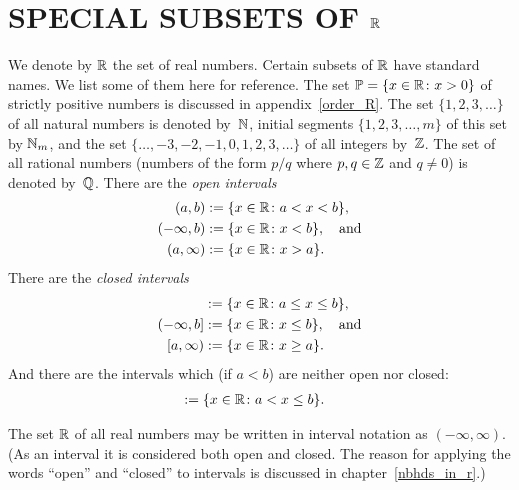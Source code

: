 \chapter{SPECIAL SUBSETS OF $\mathbb{R}$}


We denote by
$\mathbb{R}$ the set of real numbers.  Certain subsets of $\mathbb{R}$ have standard names.  We list some of
them here for reference. The set
$\mathbb{P} = \{x \in \mathbb{R}\colon  x > 0\}$ of strictly positive numbers is discussed in
appendix~\ref{order_R}. The set $\{1,2,3,\dots\}$ of all
natural numbers is denoted by~$\mathbb{N}$, initial segments $\{1,2,3,\dots,m\}$ of this set by
$\mathbb{N}_m$, and the set $\{\dots,-3,-2,-1,0,1,2,3,\dots\}$ of all
integers by~$\mathbb{Z}$.  The set of all rational numbers (numbers of the form $p/q$ where $p,q \in
\mathbb{Z}$ and $q \ne 0$) is denoted
by~$\mathbb{Q}$. There are the \emph{open intervals}
\begin{align*}
            (a,b) &:= \{x \in \mathbb{R}\colon a < x < b\}, \\
      (-\infty,b) &:= \{x \in \mathbb{R}\colon x < b\},\quad\text{and} \\
      (a, \infty) &:= \{x \in \mathbb{R}\colon x > a\}.
\end{align*}
There are the \emph{closed intervals}
\begin{align*}
            [a,b] &:= \{x \in \R\colon a \le x \le b\}, \\
      (-\infty,b] &:= \{x \in \R\colon x \le b\}, \quad\text{and} \\
      [a, \infty) &:= \{x \in \R\colon x \ge a\}.
\end{align*}
And there are the intervals which (if $a < b$) are neither open nor closed:
\begin{align*}
            [a,b) &:= \{x \in \R\colon a \le x < b\} \quad\text{and} \\
            (a,b] &:= \{x \in \R\colon a < x \le b\}.
\end{align*}

The set $\mathbb{R}$ of all real numbers may be written in interval notation as $(-\infty, \infty)$.
(As an interval it is considered both open and closed.  The reason for applying the words
``open'' and  ``closed'' to intervals is discussed in chapter~\ref{nbhds_in_r}.)


